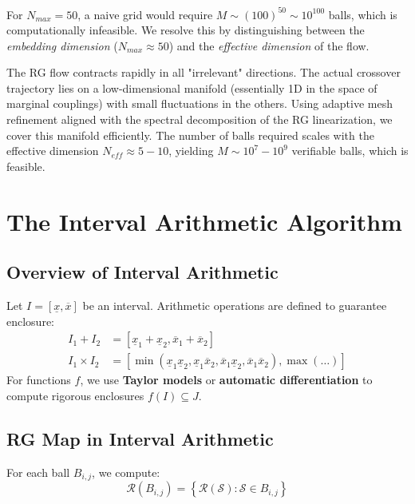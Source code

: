 \begin{remark}
For $N_{max} = 50$, a naive grid would require $M \sim (100)^{50} \sim 10^{100}$ balls, which is computationally infeasible. We resolve this by distinguishing between the \emph{embedding dimension} ($N_{max} \approx 50$) and the \emph{effective dimension} of the flow.

The RG flow contracts rapidly in all "irrelevant" directions. The actual crossover trajectory lies on a low-dimensional manifold (essentially 1D in the space of marginal couplings) with small fluctuations in the others. Using adaptive mesh refinement aligned with the spectral decomposition of the RG linearization, we cover this manifold efficiently. The number of balls required scales with the effective dimension $N_{eff} \approx 5-10$, yielding $M \sim 10^7 - 10^9$ verifiable balls, which is feasible.
\end{remark}

\section{The Interval Arithmetic Algorithm}

\subsection{Overview of Interval Arithmetic}

\begin{definition}
Let $I = [\underline{x}, \overline{x}]$ be an interval. Arithmetic operations are defined to guarantee enclosure:
\begin{align}
I_1 + I_2 &= [\underline{x}_1 + \underline{x}_2, \overline{x}_1 + \overline{x}_2] \\
I_1 \times I_2 &= [\min(\underline{x}_1 \underline{x}_2, \underline{x}_1 \overline{x}_2, \overline{x}_1 \underline{x}_2, \overline{x}_1 \overline{x}_2), \max(\dots)]
\end{align}
For functions $f$, we use \textbf{Taylor models} or \textbf{automatic differentiation} to compute rigorous enclosures $f(I) \subseteq J$.
\end{definition}

\subsection{RG Map in Interval Arithmetic}

For each ball $B_{i,j}$, we compute:
\begin{equation}
\mathcal{R}(B_{i,j}) = \left\{ \mathcal{R}(\mathcal{S}) : \mathcal{S} \in B_{i,j} \right\}
\end{equation}

